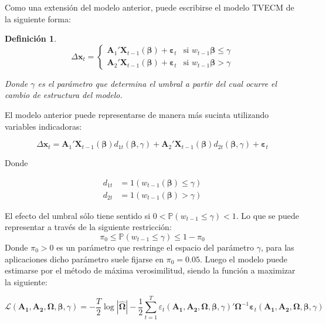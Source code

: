 \documentclass[12pt, twoside]{book}\usepackage[]{graphicx}\usepackage[]{color}
\numberwithin{equation}{section}
\numberwithin{theorem}{section}
\numberwithin{teorema}{section}
\newtheorem{defi}{Definición}
\newenvironment{defin}
      {\begin{shaded}\begin{defi}}
      {\end{defi}\end{shaded}}
\numberwithin{defi}{section}
\numberwithin{prop}{section}
\numberwithin{defi}{section}
\theoremstyle{plain}
\begin{document}
Como una extensión del modelo anterior, puede escribirse el modelo TVECM de la siguiente forma: 

\begin{defin}
\begin{equation}
\Delta \mathbf{x}_{t} = \begin{cases} 
\mathbf{A}_{1}'\mathbf{X}_{t-1}(\boldsymbol{\beta})+\boldsymbol{\varepsilon}_{t} & \text{si }w_{t-1}\boldsymbol{\beta}\leq \gamma \\ 
\mathbf{A}_{2}'\mathbf{X}_{t-1}(\boldsymbol{\beta})+\boldsymbol{\varepsilon}_{t} & \text{si }w_{t-1}\boldsymbol{\beta}> \gamma
\end{cases}
\end{equation}

Donde $\gamma$ es el parámetro que determina el umbral a partir del cual ocurre el cambio de estructura del modelo. 
\end{defin}

El modelo anterior puede representarse de manera más sucinta utilizando variables indicadoras: 

\begin{equation}
\Delta \mathbf{x}_{t} = \mathbf{A}_{1}'\mathbf{X}_{t-1}(\boldsymbol{\beta})d_{1t}(\boldsymbol{\beta},\gamma)+\mathbf{A}_{2}'\mathbf{X}_{t-1}(\boldsymbol{\beta})d_{2t}(\boldsymbol{\beta},\gamma)+\boldsymbol{\varepsilon}_{t}
\end{equation}

Donde 

\begin{align}
d_{1t} & = 1(w_{t-1}(\boldsymbol{\beta})\leq \gamma) \\
d_{2t} & = 1(w_{t-1}(\boldsymbol{\beta})> \gamma) 
\end{align}

El efecto del umbral sólo tiene sentido si $0<\mathbb{P}(w_{t-1}\leq \gamma)<1$. Lo que se puede representar a través de la siguiente restricción: 
\begin{equation}
\pi_{0}\leq \mathbb{P}(w_{t-1}\leq \gamma)\leq 1-\pi_{0}
\end{equation}
Donde $\pi_{0}>0$ es un parámetro que restringe el espacio del parámetro $\gamma$, para las aplicaciones dicho parámetro suele fijarse en $\pi_{0}=0.05$. Luego el modelo puede estimarse por el método de máxima verosimilitud, siendo la función a maximizar la siguiente:

\begin{equation}
\mathcal{L}(\mathbf{A_{1},A_{2}},\boldsymbol{\Omega,\beta},\gamma) = -
\frac{T}{2}\log |\hat{\boldsymbol{\Omega}}|-\frac{1}{2}\sum_{t=1}^{T}\varepsilon_{t}(\mathbf{A_{1},A_{2}},\boldsymbol{\Omega,\beta},\gamma)'\boldsymbol{\Omega}^{-1}\boldsymbol{\varepsilon}_{t}(\mathbf{A_{1},A_{2}},\boldsymbol{\Omega,\beta},\gamma)
\end{equation}
\end{document}
